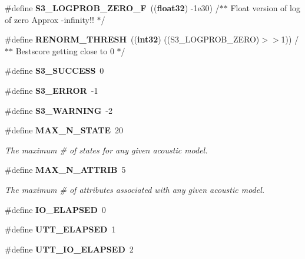 \begin{DoxyCompactItemize}
\item 
\#define {\bfseries \-S3\-\_\-\-L\-O\-G\-P\-R\-O\-B\-\_\-\-Z\-E\-R\-O\-\_\-\-F}~(({\bf float32}) -\/1e30)	/$\ast$$\ast$ Float version of log of zero Approx -\/infinity!! $\ast$/\label{s3types_8h_a8d5747af7c36ef6208617e1b5db06cf0}

\item 
\#define {\bfseries \-R\-E\-N\-O\-R\-M\-\_\-\-T\-H\-R\-E\-S\-H}~(({\bf int32}) ((\-S3\-\_\-\-L\-O\-G\-P\-R\-O\-B\-\_\-\-Z\-E\-R\-O)$>$$>$1))       /$\ast$$\ast$ \-Bestscore getting close to 0 $\ast$/\label{s3types_8h_a610a0917725582c80011c031d1a402b8}

\item 
\#define {\bfseries \-S3\-\_\-\-S\-U\-C\-C\-E\-S\-S}~0\label{s3types_8h_a1bb6112acd0be019c61bc87890a5e527}

\item 
\#define {\bfseries \-S3\-\_\-\-E\-R\-R\-O\-R}~-\/1\label{s3types_8h_a3d4835a7a30401faf5d012927996c62a}

\item 
\#define {\bfseries \-S3\-\_\-\-W\-A\-R\-N\-I\-N\-G}~-\/2\label{s3types_8h_a38d65894166f39b4000c6018be946bc5}

\item 
\#define {\bf \-M\-A\-X\-\_\-\-N\-\_\-\-S\-T\-A\-T\-E}~20\label{s3types_8h_a0aed240c1318ac601a4a35ba21c152b6}

\begin{DoxyCompactList}\small\item\em \-The maximum \# of states for any given acoustic model. \end{DoxyCompactList}\item 
\#define {\bf \-M\-A\-X\-\_\-\-N\-\_\-\-A\-T\-T\-R\-I\-B}~5\label{s3types_8h_acfbabf70ac5778a1d060ac25b0dff433}

\begin{DoxyCompactList}\small\item\em \-The maximum \# of attributes associated with any given acoustic model. \end{DoxyCompactList}\item 
\#define {\bfseries \-I\-O\-\_\-\-E\-L\-A\-P\-S\-E\-D}~0\label{s3types_8h_a8506cbe30493f34c2e82a91572004db6}

\item 
\#define {\bfseries \-U\-T\-T\-\_\-\-E\-L\-A\-P\-S\-E\-D}~1\label{s3types_8h_aff1028519f30eb719a5b8344c317adbc}

\item 
\#define {\bfseries \-U\-T\-T\-\_\-\-I\-O\-\_\-\-E\-L\-A\-P\-S\-E\-D}~2\label{s3types_8h_a7c02eadda7025b7054a574bbd00e09d8}


\end{DoxyCompactItemize}

